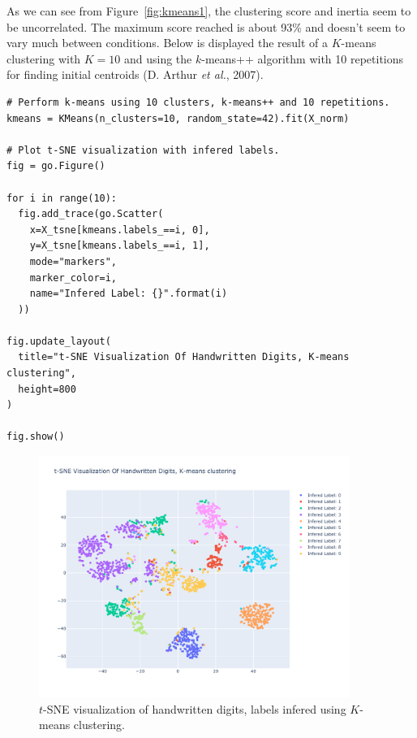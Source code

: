 \documentclass[12pt]{article}
\begin{document}
  As we can see from Figure~\ref{fig:kmeans1}, the clustering score and inertia
  seem to be uncorrelated. The maximum score reached is about 93\% and doesn't
  seem to vary much between conditions. Below is displayed the result of a
  $K$-means clustering with $K = 10$ and using the $k$-means++ algorithm with
  10 repetitions for finding initial centroids (D. Arthur \textit{et al.},
  2007).

  \begin{lstlisting}[caption={Visualize $K$-means results using $t$-SNE.},
    captionpos=b, label={lst:kmeanstsne}]
# Perform k-means using 10 clusters, k-means++ and 10 repetitions.
kmeans = KMeans(n_clusters=10, random_state=42).fit(X_norm)

# Plot t-SNE visualization with infered labels.
fig = go.Figure()

for i in range(10):
  fig.add_trace(go.Scatter(
    x=X_tsne[kmeans.labels_==i, 0],
    y=X_tsne[kmeans.labels_==i, 1],
    mode="markers",
    marker_color=i,
    name="Infered Label: {}".format(i)
  ))

fig.update_layout(
  title="t-SNE Visualization Of Handwritten Digits, K-means clustering",
  height=800
)
    
fig.show()
  \end{lstlisting}

  \begin{figure}[!ht]
    \centering
    \includegraphics[width=0.9\textwidth]{figures/kmeanstsne}
    \caption{$t$-SNE visualization of handwritten digits, labels infered using
      $K$-means clustering.}%
    \label{fig:kmeanstsne}
  \end{figure} 
\end{document}
